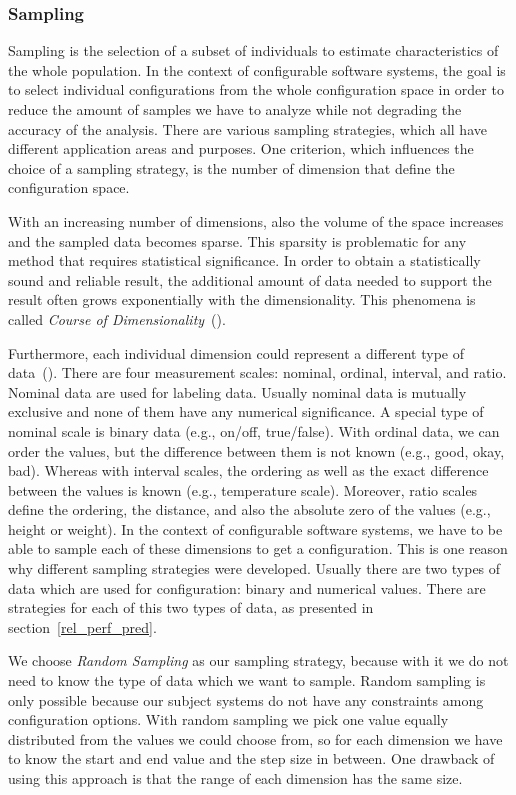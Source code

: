 \subsubsection{Sampling}
\label{perf_measure_sampling}

Sampling is the selection of a subset of individuals to estimate characteristics of the whole population. In the context of configurable software systems, the goal is to select individual configurations from the whole configuration space in order to reduce the amount of samples we have to analyze while not degrading the accuracy of the analysis. There are various sampling strategies, which all have different application areas and purposes. One criterion, which influences the choice of a sampling strategy, is the number of dimension that define the configuration space. 

With an increasing number of dimensions, also the volume of the space increases and the sampled data becomes sparse. This sparsity is problematic for any method that requires statistical significance. In order to obtain a statistically sound and reliable result, the additional amount of data needed to support the result often grows exponentially with the dimensionality. This phenomena is called \textit{Course of Dimensionality}~(\cite{donoho2000high}).

Furthermore, each individual dimension could represent a different type of data~(\cite{stevens1946theory}). There are four measurement scales: nominal, ordinal, interval, and ratio. Nominal data are used for labeling data. Usually nominal data is mutually exclusive and none of them have any numerical significance. A special type of nominal scale is binary data (e.g., on/off, true/false). With ordinal data, we can order the values, but the difference between them is not known (e.g., good, okay, bad). Whereas with interval scales, the ordering as well as the exact difference between the values is known (e.g., temperature scale). Moreover, ratio scales define the ordering, the distance, and also the absolute zero of the values (e.g., height or weight). In the context of configurable software systems, we have to be able to sample each of these dimensions to get a configuration. This is one reason why different sampling strategies were developed. Usually there are two types of data which are used for configuration: binary and numerical values. There are strategies for each of this two types of data, as presented in section~\ref{rel_perf_pred}.

We choose \textit{Random Sampling} as our sampling strategy, because with it we do not need to know the type of data which we want to sample. Random sampling is only possible because our subject systems do not have any constraints among configuration options. With random sampling we pick one value equally distributed from the values we could choose from, so for each dimension we have to know the start and end value and the step size in between. One drawback of using this approach is that the range of each dimension has the same size.


